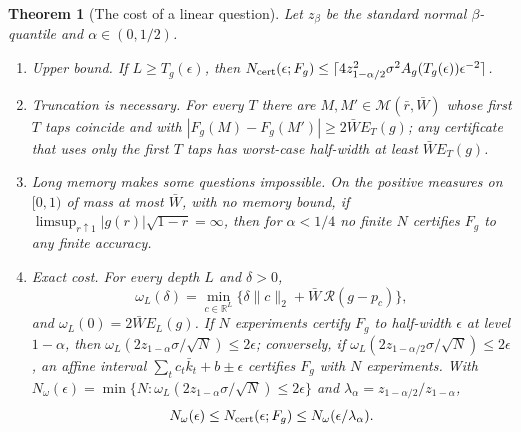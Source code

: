 \documentclass[12pt]{article}
\newtheorem{theorem}{Theorem}[section]
\theoremstyle{definition}
\theoremstyle{remark}
\begin{document}
\begin{theorem}[The cost of a linear question]\label{thm:questions}
Let $z_\beta$ be the standard normal $\beta$-quantile and $\alpha\in(0,1/2)$.
\begin{enumerate}[label=(\roman*)]
\item \emph{Upper bound.} If $L\ge T_g(\epsilon)$, then $N_{\rm cert}(\epsilon;F_g)\le\lceil4z_{1-\alpha/2}^2\sigma^2A_g(T_g(\epsilon))\epsilon^{-2}\rceil$.
\item \emph{Truncation is necessary.} For every $T$ there are $M,M'\in\mathcal M(\bar r,\bar W)$ whose first $T$ taps coincide and with $|F_g(M)-F_g(M')|\ge2\bar WE_T(g)$; any certificate that uses only the first $T$ taps has worst-case half-width at least $\bar WE_T(g)$.
\item \emph{Long memory makes some questions impossible.} On the positive measures on $[0,1)$ of mass at most $\bar W$, with no memory bound, if $\limsup_{r\uparrow1}|g(r)|\sqrt{1-r}=\infty$, then for $\alpha<1/4$ no finite $N$ certifies $F_g$ to any finite accuracy.
\item \emph{Exact cost.} For every depth $L$ and $\delta>0$,
\[
 \omega_L(\delta)=\min_{c\in\mathbb R^L}\bigl\{\delta\|c\|_2+\bar W\,\mathcal R(g-p_c)\bigr\},
\]
and $\omega_L(0)=2\bar WE_L(g)$. If $N$ experiments certify $F_g$ to half-width $\epsilon$ at level $1-\alpha$, then $\omega_L(2z_{1-\alpha}\sigma/\sqrt N)\le2\epsilon$; conversely, if $\omega_L(2z_{1-\alpha/2}\sigma/\sqrt N)\le2\epsilon$, an affine interval $\sum_tc_t\bar k_t+b\pm\epsilon$ certifies $F_g$ with $N$ experiments. With $N_\omega(\epsilon)=\min\{N:\omega_L(2z_{1-\alpha}\sigma/\sqrt N)\le2\epsilon\}$ and $\lambda_\alpha=z_{1-\alpha/2}/z_{1-\alpha}$,
\[
 N_\omega(\epsilon)\le N_{\rm cert}(\epsilon;F_g)\le N_\omega(\epsilon/\lambda_\alpha).
\]
\end{enumerate}
\end{theorem}
\end{document}
